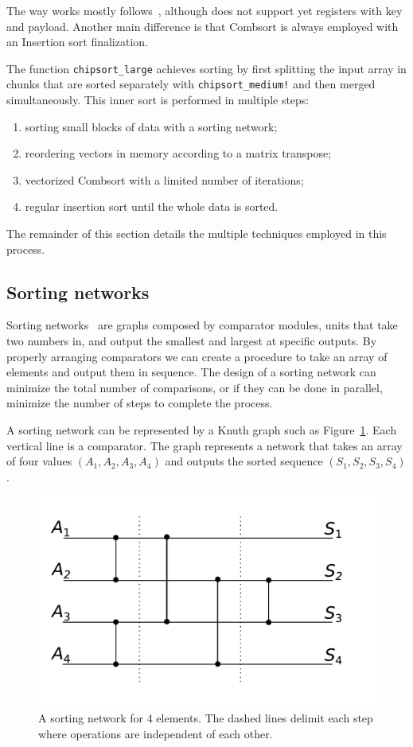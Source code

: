 \documentclass{juliacon}
\begin{document}
The way \chipsort  works mostly follows~\cite{DBLP:journals/pvldb/InoueT15}, although \chipsort does not support yet registers with key and payload. Another main difference is that Combsort is always employed with an Insertion sort finalization.

The function {\tt chipsort\_large} achieves sorting by first splitting the input array in chunks that are sorted separately with {\tt chipsort\_medium!}  and then merged simultaneously. This inner sort is performed in multiple steps:
\begin{enumerate}
\item sorting small blocks of data with a sorting network;
\item reordering vectors in memory according to a matrix transpose;
\item vectorized Combsort with a limited number of iterations;
\item regular insertion sort until the whole data is sorted.
\end{enumerate}

The remainder of this section details the multiple techniques employed in this process.

\subsection{Sorting networks}
%
Sorting networks~\cite[Sec. 5.3.4]{DBLP:books/lib/Knuth98a} are graphs composed by comparator modules, units that take two numbers in, and output the smallest and largest at specific outputs. By properly arranging comparators we can create a procedure to take an array of elements and output them in sequence. The design of a sorting network can minimize the total number of comparisons, or if they can be done in parallel, minimize the number of steps to complete the process.

A sorting network can be represented by a Knuth graph such as Figure~\ref{fig:sorting-network}. Each vertical line is a comparator. The graph represents a network that takes an array of four values $(A_1, A_2, A_3, A_4)$ and outputs the sorted sequence $(S_1, S_2, S_3, S_4)$.
\begin{figure}[htb]
\centerline{\includegraphics[width=0.6\linewidth]{fig/sorting-network-4.pdf}}
\caption{A sorting network for 4 elements. The dashed lines delimit each step where operations are independent of each other.}
\label{fig:sorting-network}
\end{figure}
\end{document}
